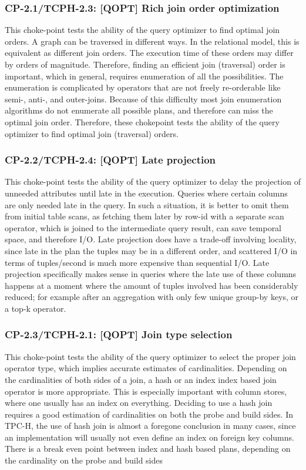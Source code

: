 \subsubsection{CP-2.1/TCPH-2.3: [QOPT]  Rich join order optimization}
\label{choke_point_2.1}
This choke-point tests the ability of the query optimizer to find optimal join orders. A graph can be traversed in different ways. In the relational model, this is equivalent as different join orders.
The execution time of these orders may differ by orders of magnitude. Therefore, finding an efficient join (traversal) order is important, which in general, requires enumeration of all the possibilities.
The enumeration is complicated by operators that are not freely re-orderable like semi-, \mbox{anti-,} and outer-joins. Because of this difficulty most join enumeration algorithms do not enumerate all possible plans, and therefore can miss the optimal join order. Therefore, these chokepoint tests the ability of the query optimizer to find optimal join (traversal) orders.

\subsubsection{CP-2.2/TCPH-2.4: [QOPT]  Late projection}
\label{choke_point_2.2}
This choke-point tests the ability of the query optimizer to delay the projection of unneeded attributes until late in the execution. Queries where certain columns are only needed late in the query.
In such a situation, it is better to omit them from initial table scans, as fetching them later by row-id with a separate scan operator, which is joined to the intermediate query result, can save temporal space, and therefore I/O.
Late projection does have a trade-off involving locality, since late in the plan the tuples may be in a different order, and scattered I/O in terms of tuples/second is much more expensive than sequential I/O.
Late projection specifically makes sense in queries where the late use of these columns happens at a moment where the amount of tuples involved has been considerably reduced;
for example after an aggregation with only few unique group-by keys, or a top-k operator.

\subsubsection{CP-2.3/TCPH-2.1: [QOPT]  Join type selection}
\label{choke_point_2.3}
This choke-point tests the ability of the query optimizer to select the proper join operator type, which implies accurate estimates of cardinalities.
Depending on the cardinalities of both sides of a join, a hash or an index index based join operator is more appropriate.
This is especially important with column stores, where one usually has an index on everything. Deciding to use a hash join requires a good estimation of cardinalities on both the probe and build sides.
In TPC-H, the use of hash join is almost a foregone conclusion in many cases, since an implementation will usually not even define an index on foreign key columns.
There is a break even point between index and hash based plans, depending on the cardinality on the probe and build sides

